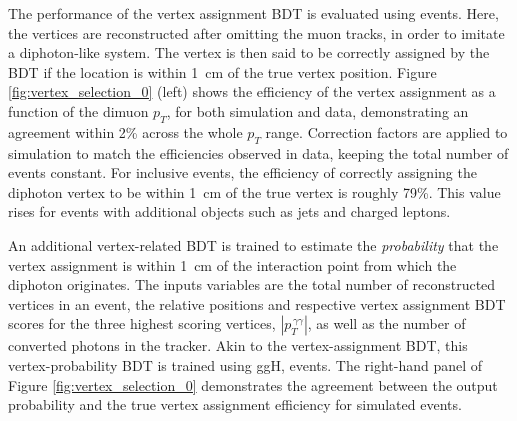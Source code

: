 The performance of the vertex assignment BDT is evaluated using \Zmumu events. Here, the vertices are reconstructed after omitting the muon tracks, in order to imitate a diphoton-like system. The vertex is then said to be correctly assigned by the BDT if the location is within 1~cm of the true vertex position. Figure \ref{fig:vertex_selection_0} (left) shows the efficiency of the vertex assignment as a function of the dimuon $p_T$, for both simulation and data, demonstrating an agreement within 2\% across the whole $p_T$ range. Correction factors are applied to simulation to match the efficiencies observed in data, keeping the total number of events constant. For inclusive \Hgg events, the efficiency of correctly assigning the diphoton vertex to be within 1~cm of the true vertex is roughly 79\%. This value rises for events with additional objects such as jets and charged leptons.

An additional vertex-related BDT is trained to estimate the \textit{probability} that the vertex assignment is within 1~cm of the interaction point from which the diphoton originates. The inputs variables are the total number of reconstructed vertices in an event, the relative positions and respective vertex assignment BDT scores for the three highest scoring vertices, $|{p}_T^{\,\gamma\gamma}|$, as well as the number of converted photons in the tracker. Akin to the vertex-assignment BDT, this vertex-probability BDT is trained using ggH, \Hgg events. The right-hand panel of Figure \ref{fig:vertex_selection_0} demonstrates the agreement between the output probability and the true vertex assignment efficiency for simulated \Zmumu events.

